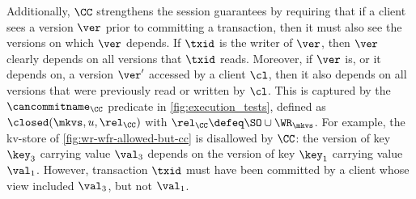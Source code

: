 Additionally, $\CC$ strengthens the session guarantees by requiring that if a client sees a version $\ver$ prior to committing a transaction, then it must also see the versions 
on which $\ver$ depends.
If $\txid$ is the writer of $\ver$, then 
$\ver$ clearly depends on all versions that $\txid$ reads. 
Moreover, if $\ver$ is, or it depends on, a version $\ver'$ accessed by 
a client $\cl$, then it also depends on all versions that were previously 
read or written by $\cl$. 
This is captured by the $\cancommitname_{\CC}$ predicate in \cref{fig:execution_tests}, 
defined as $\closed(\mkvs, u, \rel_{\CC})$ with $\rel_\CC \defeq \SO \cup \WR_{\mkvs}$.
For example, the kv-store of 
\cref{fig:wr-wfr-allowed-but-cc} 
is disallowed by $\CC$: the version of key $\key_3$ carrying value $\val_3$ depends on the version of key $\key_1$ carrying value $\val_1$. However, transaction $\txid$ must have been committed by a client whose view included $\val_3$, but not $\val_1$.

